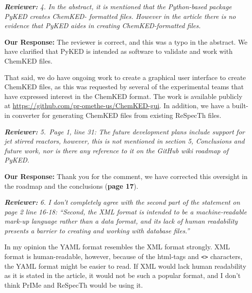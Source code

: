 \documentclass[a4paper,10pt]{elsarticle}
\newenvironment{reviewer}{\vspace{0.5\baselineskip}\begingroup\itshape\textbf{Reviewer:}}{\endgroup}
\newenvironment{response}{\textbf{Our Response:}}{\vspace{0.5\baselineskip}}
\begin{document}
\begin{reviewer}
    4. In the abstract, it is mentioned that the Python-based package PyKED creates ChemKED-
    formatted files. However in the article there is no evidence that PyKED aides in creating
    ChemKED-formatted files.
\end{reviewer}

\begin{response}
    The reviewer is correct, and this was a typo in the abstract. We have clarified that PyKED is
    intended as software to validate and work with ChemKED files.

    That said, we do have ongoing work to create a graphical user interface to create ChemKED files,
    as this was requested by several of the experimental teams that have expressed interest in the
    ChemKED format. The work is available publicly at
    \url{https://github.com/pr-omethe-us/ChemKED-gui}. In addition, we have a built-in converter
    for generating ChemKED files from existing ReSpecTh files.
\end{response}

\begin{reviewer}
    5.~Page 1, line 31: The future development plans include support for jet stirred reactors,
    however, this is not mentioned in section 5, Conclusions and future work, nor is there any
    reference to it on the GitHub wiki roadmap of PyKED.
\end{reviewer}

\begin{response}
    Thank you for the comment, we have corrected this oversight in the roadmap and the
    conclusions (\textbf{page 17}).
\end{response}

\begin{reviewer}
    6. I don't completely agree with the second part of the statement on page 2 line 16-18:
    ``Second, the XML format is intended to be a machine-readable mark-up language rather than a
    data format, and its lack of human readability presents a barrier to creating and working with
    database files.''

    In my opinion the YAML format resembles the XML format strongly. XML format is human-readable,
    however, because of the html-tags and \texttt{<>} characters, the YAML format might be easier to
    read. If XML would lack human readability as it is stated in the article, it would not be such a
    popular format, and I don't think PrIMe and ReSpecTh would be using it.
\end{reviewer}
\end{document}
